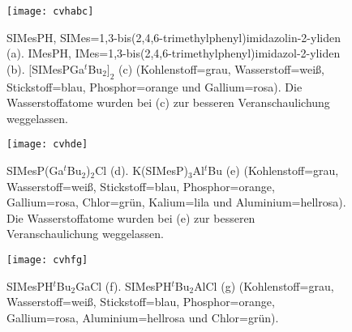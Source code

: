 \begin{figure}[ht!]
	\centering
	\texttt{[image: cvhabc]}
	\captionsetup{figurewithin = chapter}
	\captionsetup{font=small, labelfont=bf}\caption[{Abbildung von SIMesPH, IMesPH und $[$SIMesPGa$^\textit{t}$Bu$_2]_2$}]{ SIMesPH, SIMes=1,3-bis(2,4,6-tri\-me\-thyl\-phe\-nyl)imi\-da\-zo\-lin-2-yli\-den \textsf{(a)}. IMesPH, IMes=1,3-bis(2,4,6-tri\-me\-thyl\-phe\-nyl)imi\-da\-zol-2-yli\-den \textsf{(b)}. $[$SIMesPGa$^\textit{t}$Bu$_2]_2$ \textsf{(c)} (Kohlenstoff=grau, Wasserstoff=weiß, Stickstoff=blau, Phosphor=orange und Gallium=rosa). Die Wasserstoffatome wurden bei \textsf{(c)} zur besseren Veranschaulichung weggelassen.}
\label{abb:cvhabc}
\end{figure}
\vfill 
\newpage
\begin{figure}[ht!]
	\centering
	\texttt{[image: cvhde]}
	\captionsetup{figurewithin = chapter}
	\captionsetup{font=small, labelfont=bf}\caption[{Abbildung von SIMesP(Ga$^\textit{t}$Bu$_2$)$_2$Cl und K(SIMesP)$_3$Al$^\textit{t}$Bu}]{SIMesP(Ga$^\textit{t}$Bu$_2$)$_2$Cl \textsf{(d)}. K(SIMesP)$_3$Al$^\textit{t}$Bu \textsf{(e)} (Kohlenstoff=grau, Wasserstoff=weiß, Stickstoff=blau, Phosphor=orange, Gallium=rosa, Chlor=grün, Kalium=lila und Aluminium=hellrosa). Die Wasserstoffatome wurden bei \textsf{(e)} zur besseren Veranschaulichung weggelassen.}
\label{abb:cvhde}
\end{figure}
\vfill 
\newpage
\begin{figure}[ht!]
	\centering
	\texttt{[image: cvhfg]}
	\captionsetup{figurewithin = chapter}
	\captionsetup{font=small, labelfont=bf}\caption[{Abbildung von SIMesPH$^\textit{t}$Bu$_2$GaCl und SIMesPH$^\textit{t}$Bu$_2$AlCl}]{SIMesPH$^\textit{t}$Bu$_2$GaCl \textsf{(f)}. SIMesPH$^\textit{t}$Bu$_2$AlCl \textsf{(g)} (Kohlenstoff=grau, Wasserstoff=weiß, Stickstoff=blau, Phosphor=orange, Gallium=rosa, Aluminium=hellrosa und Chlor=grün).}
\label{abb:cvhfg}
\end{figure}
\FloatBarrier

